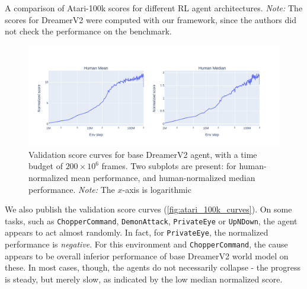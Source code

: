 \documentclass[en]{pracamgr}
\newcommand{\env}[1]{{\tt #1}}
\newcommand{\figurewidth}{\linewidth}
\newcommand{\figureheight}{0.8\paperheight}
\begin{document}
\begin{table}
  \centering
  \begin{adjustbox}{width=1.0\textwidth}
    }
  \end{adjustbox}
  \caption{A comparison of Atari-100k scores for different RL agent architectures. \emph{Note:} The scores for DreamerV2 were computed with our framework, since the authors did not check the performance on the benchmark.}
  \label{tab:atari_100k_scores}
\end{table}

\begin{figure}
  \centering
  \includegraphics[width=\figurewidth,height=\figureheight,keepaspectratio]{assets/dreamerv2_curves.pdf}
  \caption{Validation score curves for base DreamerV2 agent, with a time budget of $200 \times 10^6$ frames. Two subplots are present: for human-normalized mean performance, and human-normalized median performance. \emph{Note:} The $x$-axis is logarithmic}
  \label{fig:dreamerv2_curves}
\end{figure}

We also publish the validation score curves (\autoref{fig:atari_100k_curves}). On some tasks, such as \env{ChopperCommand}, \env{DemonAttack}, \env{PrivateEye} or \env{UpNDown}, the agent appears to act almost randomly. In fact, for \env{PrivateEye}, the normalized performance is \emph{negative}. For this environment and \env{ChopperCommand}, the cause appears to be overall inferior performance of base DreamerV2 world model on these. In most cases, though, the agents do not necessarily collapse - the progress is steady, but merely slow, as indicated by the low median normalized score.
\end{document}
